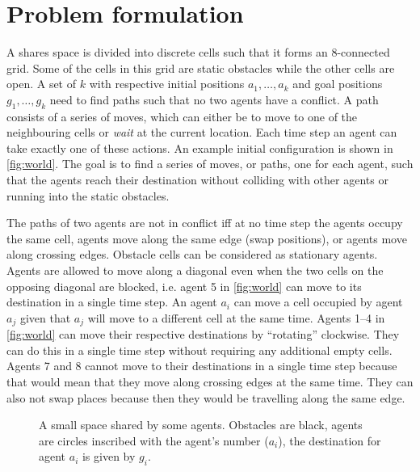 \section{Problem formulation}\label{sec:problem}
A shares space is divided into discrete cells such that it forms an 8-connected
grid. Some of the cells in this grid are static obstacles while the other cells
are open. A set of $k$ with respective initial positions $a_1, \ldots, a_k$ and
goal positions $g_1, \ldots, g_k$ need to find paths such that no two agents
have a conflict. A path consists of a series of moves, which can either be to
move to one of the neighbouring cells or \emph{wait} at the current location.
Each time step an agent can take exactly one of these actions.
An example initial configuration is shown in \autoref{fig:world}. The goal is
to find a series of moves, or paths, one for each agent, such that the agents
reach their destination without colliding with other agents or running into the
static obstacles.

The paths of two agents are not in conflict iff at no time step the agents
occupy the same cell, agents move along the same edge (swap positions), or
agents move along
crossing edges. Obstacle cells can be considered as stationary agents. Agents
are allowed to move along a diagonal even when the two cells on the opposing
diagonal are blocked, i.e. agent 5 in \autoref{fig:world} can move to its
destination in a single time step. An agent $a_i$ can move a cell occupied by
agent $a_j$ given that $a_j$ will move to a different cell at the same time.
Agents 1--4 in \autoref{fig:world} can move their respective destinations
by ``rotating'' clockwise. They can do this in a single time step without
requiring any additional empty cells. Agents 7 and 8 cannot move to their
destinations in a single time step because that would mean that they move along
crossing edges at the same time. They can also not swap places because then
they would be travelling along the same edge.

\begin{figure}[t]
    \centering
    \def\svgscale{.7}
    
    \caption{A small space shared by some agents. Obstacles are black, agents
        are circles inscribed with the agent's number ($a_i$), the destination
        for
        agent $a_i$ is given by $g_i$.}
    \label{fig:world}
\end{figure}
